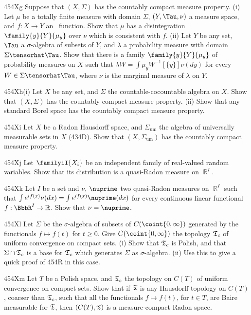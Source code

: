{\spheader 454Xg Suppose that $(X,\Sigma)$ has the countably compact
measure property.   (i) Let $\mu$ be a totally finite measure with
domain $\Sigma$, $(Y,\Tau,\nu)$ a measure space, and $f:X\to Y$ an \imp\
function.   Show that $\mu$ has a disintegration $\family{y}{Y}{\mu_y}$
over $\nu$ which is consistent with $f$.
(ii) Let $Y$ be any set, $\Tau$ a $\sigma$-algebra of subsets of $Y$,
and $\lambda$ a probability measure with domain $\Sigma\tensorhat\Tau$.
Show that there is a family $\family{y}{Y}{\mu_y}$ of probability
measures on $X$ such that
$\lambda W=\int\mu_yW^{-1}[\{y\}]\nu(dy)$ for every
$W\in\Sigma\tensorhat\Tau$, where $\nu$ is the marginal measure of
$\lambda$ on $Y$.   \Hint{452M.}

\spheader 454Xh(i) Let $X$ be any set, and $\Sigma$ the
countable-cocountable algebra on $X$.   Show that $(X,\Sigma)$ has the
countably compact measure property.  (ii) Show that any standard Borel
space has the countably compact measure property.

\spheader 454Xi Let $X$ be a Radon Hausdorff space, and
$\Sigma_{\text{um}}$ the
algebra of universally measurable sets in $X$ (434D).   Show that
$(X,\Sigma_{\text{um}})$ has the countably compact measure property.

\sqheader 454Xj Let $\familyiI{X_i}$ be an independent
family of real-valued random
variables.   Show that its distribution is
a quasi-Radon measure on $\BbbR^I$.   

\spheader 454Xk Let $I$ be a set and $\nu$, $\nuprime$ two quasi-Radon
measures on $\BbbR^I$ such that
$\int e^{if(x)}\nu(dx)=\int e^{if(x)}\nuprime(dx)$ for every continuous
linear functional $f:\BbbR^I\to\Bbb R$.   Show that $\nu=\nuprime$.

\sqheader 454Xl Let $\Sigma$ be the $\sigma$-algebra of subsets of
$C(\coint{0,\infty})$ generated by the functionals $f\mapsto f(t)$ for
$t\ge 0$.   Give $C(\coint{0,\infty})$ the topology $\frak T_c$ of
uniform convergence on compact sets.   (i) Show that $\frak T_c$ is
Polish, and that $\Sigma\cap\frak T_c$ is a base for $\frak T_c$ which
generates $\Sigma$ as $\sigma$-algebra.   (ii) Use this to give a quick
proof of 454R in this case.

\spheader 454Xm Let $T$ be a Polish space, and $\frak T_c$ the topology
on $C(T)$ of uniform convergence on compact sets.   Show that if
$\frak T$ is any Hausdorff topology on $C(T)$, coarser than $\frak T_c$,
such that all the functionals $f\mapsto f(t)$, for $t\in T$, are Baire
measurable for $\frak T$, then $(C(T),\frak T)$ is a measure-compact
Radon space.

}
